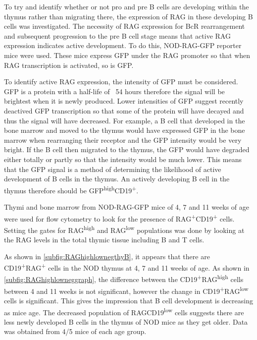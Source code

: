 To try and identify whether or not pro and pre B cells are developing within the thymus rather than migrating there, the expression of RAG in these developing B cells was investigated.
The necessity of RAG expression for BcR rearrangement and subsequent progression to the pre B cell stage means that active RAG expression indicates active development.
To do this, NOD-RAG-GFP reporter mice were used.
These mice express GFP under the RAG promoter so that when RAG transcription is activated, so is GFP.

To identify active RAG expression, the intensity of GFP must be considered.
GFP is a protein with a half-life of ~54 hours therefore the signal will be brightest when it is newly produced.
Lower intensities of GFP suggest recently deactived GFP transcription so that some of the protein will have decayed and thus the signal will have decreased.
For example, a B cell that developed in the bone marrow and moved to the thymus would have expressed GFP in the bone marrow when rearranging their receptor and the GFP intensity would be very bright.
If the B cell then migrated to the thymus, the GFP would have degraded either totally or partly so that the intensity would be much lower.
This means that the GFP signal is a method of determining the likelihood of active development of B cells in the thymus.
An actively developing B cell in the thymus therefore should be GFP\textsuperscript{high}CD19\textsuperscript{+}.

Thymi and bone marrow from NOD-RAG-GFP mice of 4, 7 and 11 weeks of age were used for flow cytometry to look for the presence of RAG\textsuperscript{+}CD19\textsuperscript{+} cells.
Setting the gates for RAG\textsuperscript{high} and RAG\textsuperscript{low} populations was done by looking at the RAG levels in the total thymic tissue including B and T cells.

As shown in \cref{subfig:RAGhighlownegthyB}, it appears that there are CD19\textsuperscript{+}RAG\textsuperscript{+} cells in the NOD thymus at 4, 7 and 11 weeks of age.
As shown in \cref{subfig:RAGhighlowneggraph}, the difference between the CD19\textsuperscript{+}RAG\textsuperscript{high} cells between 4 and 11 weeks is not significant, however the change in CD19\textsuperscript{+}RAG\textsuperscript{low} cells is significant.
This gives the impression that B cell development is decreasing as mice age.
The decreased population of RAGCD19\textsuperscript{low} cells suggests there are less newly developed B cells in the thymus of NOD mice as they get older.
Data was obtained from 4/5 mice of each age group.


